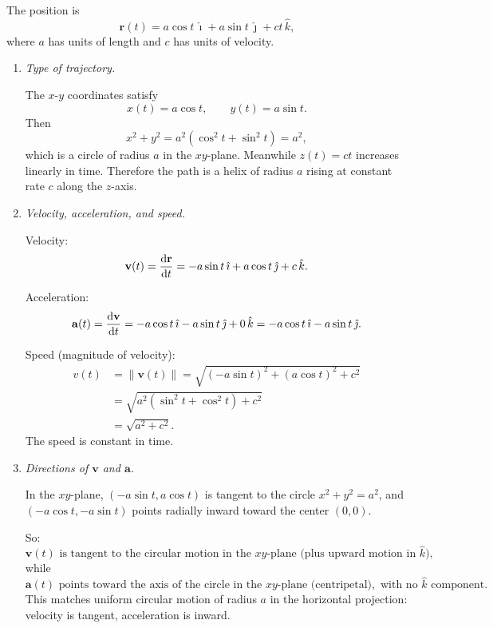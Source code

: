 \documentclass[../main.tex]{subfiles}
\begin{document}
\begin{enumerate}
The position is
\[
  \mathbf{r}(t) = a\cos t \,\hat{\imath} + a\sin t \,\hat{\jmath} + ct \,\hat{k},
\]
where $a$ has units of length and $c$ has units of velocity.

\begin{enumerate}
    \item \textit{Type of trajectory.}

    The $x$-$y$ coordinates satisfy
    \[
      x(t)=a\cos t, \qquad y(t)=a\sin t.
    \]
    Then
    \[
      x^2 + y^2 = a^2(\cos^2 t + \sin^2 t)=a^2,
    \]
    which is a circle of radius $a$ in the $xy$-plane. Meanwhile $z(t)=ct$ increases linearly in time. Therefore the path is a helix of radius $a$ rising at constant rate $c$ along the $z$-axis.

    \item \textit{Velocity, acceleration, and speed.}

    Velocity:
    \[
      \mathbf{v}(t) = \dv{\mathbf{r}}{t}
      = -a\sin t \,\hat{\imath} + a\cos t \,\hat{\jmath} + c\,\hat{k}.
    \]

    Acceleration:
    \[
      \mathbf{a}(t) = \dv{\mathbf{v}}{t}
      = -a\cos t \,\hat{\imath} - a\sin t \,\hat{\jmath} + 0\,\hat{k}
      = -a\cos t \,\hat{\imath} - a\sin t \,\hat{\jmath}.
    \]

    Speed (magnitude of velocity):
    \begin{align*}
      v(t) &= \|\mathbf{v}(t)\|
      = \sqrt{(-a\sin t)^2 + (a\cos t)^2 + c^2} \\
      &= \sqrt{a^2(\sin^2 t + \cos^2 t) + c^2} \\
      &= \sqrt{a^2 + c^2}.
    \end{align*}
    The speed is constant in time.

    \item \textit{Directions of $\mathbf{v}$ and $\mathbf{a}$.}

    In the $xy$-plane, $(-a\sin t, a\cos t)$ is tangent to the circle $x^2+y^2=a^2$, and $(-a\cos t, -a\sin t)$ points radially inward toward the center $(0,0)$.

    So:
    \[
      \mathbf{v}(t) \text{ is tangent to the circular motion in the } xy\text{-plane (plus upward motion in } \hat{k}),
    \]
    while
    \[
      \mathbf{a}(t) \text{ points toward the axis of the circle in the } xy\text{-plane (centripetal)}, \text{ with no }\hat{k}\text{ component.}
    \]
    This matches uniform circular motion of radius $a$ in the horizontal projection: velocity is tangent, acceleration is inward.


\end{enumerate}
\end{enumerate}
\end{document}
